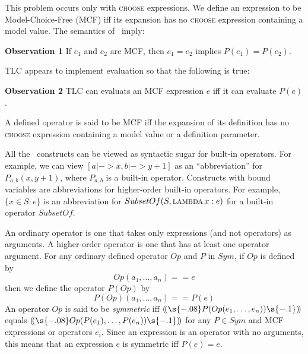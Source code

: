 \documentclass[fleqn,leqno]{article}
\newcommand{\sym}{\ensuremath{Sym}}
\newcommand{\tlc}[1]{\ensuremath{(\!(\s{-.08}#1\s{-.1})\!)}}
\begin{document}
This problem occurs only with \textsc{choose}
expressions.  We define an expression to be {Model-Choice-Free} (MCF)
iff its expansion has no \textsc{choose} expression containing a model
value.  The semantics of \tlaplus\ imply:
\begin{display}
\textbf{Observation 1 } If $e_{1}$ and $e_{2}$ are MCF, then
${e_{1}=e_{2}}$ implies ${P(e_{1})}={P(e_{2})}$.
\end{display}
TLC appears to implement evaluation so that the following is true:
\begin{display}
\textbf{Observation 2 } TLC can evaluats an MCF expression $e$ 
iff it can evaluate $P(e)$.
\end{display}
A defined operator is said to be MCF iff the expansion of its
definition has no \textsc{choose} expression containing a model value
or a definition parameter.  

All the \tlaplus\ constructs can be viewed as syntactic sugar
for built-in operators.  For example, we can view
 $ [a |-> x, b |-> y+1]$
as an ``abbreviation'' for $P_{a,b}(x, y+1)$, where $P_{a,b}$ is
a built-in operator.  Constructs with bound variables are abbreviations
for higher-order built-in operators.  For example,
 $\{x \in S : e\}$
is an abbreviation for
 \mbox{$ SubsetOf(S, \textsc{lambda} \, x : e)
 $}
for a built-in operator $SubsetOf$.

An ordinary operator is one that takes only expressions (and not
operators) as arguments.  A higher-order operator is one that has at
least one operator argument.  For any ordinary defined operator $Op$
and $P$ in \sym, if $Op$ is defined by
 \[ Op(a_{1},\ldots, a_{n}) == e
 \]
then we define the operator $P(Op)$ by
  \[ P(Op)(a_{1},\ldots, a_{n}) == P(e)
  \]
An operator $Op$ is said to be \emph{symmetric} iff
 $\tlc{P(Op(e_{1},\ldots, e_{n}))}$ equals 
\linebreak
 $\tlc{Op(P(e_{1}),\ldots, P(e_{n}))}$ 
for any $P\in\sym$ and MCF expressions or operators $e_{i}$.  Since an
expression is an operator with no arguments, this means that an
expression $e$ is symmetric iff $P(e)=e$.
\end{document}
